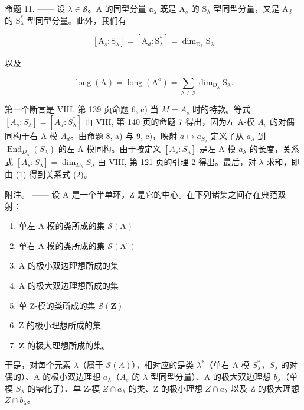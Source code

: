命题 11. —— 设 \(\lambda \in \mathcal{S}\)。A 的同型分量 \(\mathfrak{a}_{\lambda}\) 既是 \(\mathrm{A}_s\) 的 \(\mathrm{S}_{\lambda}\) 型同型分量，又是 \(\mathrm{A}_d\) 的 \(\mathrm{S}_{\lambda}^{*}\) 型同型分量。此外，我们有

\[
[ \mathrm{A} _ {s}: \mathrm{S} _ {\lambda} ] = [ \mathrm{A} _ {d}: \mathrm{S} _ {\lambda} ^ {*} ] = \dim_ {\mathrm{D} _ {\lambda}} \mathrm{S} _ {\lambda}\tag{1}
\]

以及

\[
\operatorname{long} (\mathrm{A}) = \operatorname{long} \left(\mathrm{A} ^ {\mathrm{o}}\right) = \sum_ {\lambda \in \mathscr {S}} \dim_ {\mathrm{D} _ {\lambda}} \mathrm{S} _ {\lambda}.\tag{2}
\]

第一个断言是 VIII, 第 139 页命题 6, c) 当 \(M = A_{s}\) 时的特款。等式 \([A_{s} : S_{\lambda}] = [A_{d} : S_{\lambda}^{*}]\) 由 VIII, 第 140 页的命题 7 得出，因为左 A-模 \(A_{s}\) 的对偶同构于右 A-模 \(A_{d}\)。由命题 8, a) 与 9, c)，映射 \(a \mapsto a_{S_{\lambda}}\) 定义了从 \(a_{\lambda}\) 到 \(\operatorname{End}_{D_{\lambda}}(S_{\lambda})\) 的左 A-模同构。由于按定义 \([A_{s} : S_{\lambda}]\) 是左 A-模 \(a_{\lambda}\) 的长度，关系式 \([A_{s} : S_{\lambda}] = \dim_{D_{\lambda}} S_{\lambda}\) 由 VIII, 第 121 页的引理 2 得出。最后，对 \(\lambda\) 求和，即由 (1) 得到关系式 (2)。

附注。 —— 设 A 是一个半单环，Z 是它的中心。在下列诸集之间存在典范双射：

\begin{enumerate}
\def\labelenumi{\alph{enumi})}
\item
  单左 A-模的类所成的集 \(\mathcal{S}(\mathrm{A})\)
\item
  单右 A-模的类所成的集 \(\mathcal{S}(\mathrm{A}^{\circ})\)
\item
  A 的极小双边理想所成的集
\item
  A 的极大双边理想所成的集
\item
  单 Z-模的类所成的集 \(\mathcal{S}(\mathbf{Z})\)
\item
  Z 的极小理想所成的集
\item
  \(\mathbf{Z}\) 的极大理想所成的集。
\end{enumerate}

于是，对每个元素 \(\lambda\)（属于 \(\mathcal{S}(A)\)），相对应的是类 \(\lambda^{*}\)（单右 A-模 \(S_{\lambda}^{*}\)，\(S_{\lambda}\) 的对偶的）、A 的极小双边理想 \(a_{\lambda}\)（\(A_{s}\) 的 \(\lambda\) 型同型分量）、A 的极大双边理想 \(b_{\lambda}\)（单模 \(S_{\lambda}\) 的零化子）、单 Z-模 \(Z \cap a_{\lambda}\) 的类、Z 的极小理想 \(Z \cap a_{\lambda}\) 以及 Z 的极大理想 \(Z \cap b_{\lambda}\)。

